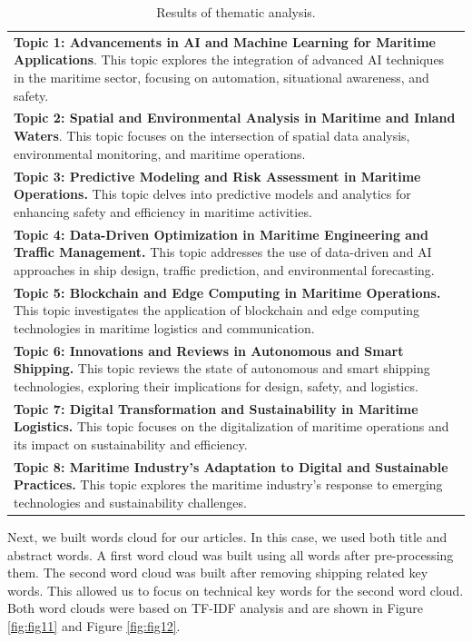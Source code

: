 \documentclass[a4paper, review, endfloat, authoryear]{elsarticle}
\begin{document}
	\begin{table}[h]
		\centering
		\caption{Results of thematic analysis.}
		\begin{tabularx}{\linewidth}{X}
			\hline
			\textbf{Topic 1: Advancements in AI and Machine Learning for Maritime Applications}. This topic explores the integration of advanced AI techniques in the maritime sector, focusing on automation, situational awareness, and safety.\\			
			\textbf{Topic 2: Spatial and Environmental Analysis in Maritime and Inland Waters}. This topic focuses on the intersection of spatial data analysis, environmental monitoring, and maritime operations.\\			
			\textbf{Topic 3: Predictive Modeling and Risk Assessment in Maritime Operations.} This topic delves into predictive models and analytics for enhancing safety and efficiency in maritime activities.\\			
			\textbf{Topic 4: Data-Driven Optimization in Maritime Engineering and Traffic Management.} This topic addresses the use of data-driven and AI approaches in ship design, traffic prediction, and environmental forecasting.\\			
			\textbf{Topic 5: Blockchain and Edge Computing in Maritime Operations.} This topic investigates the application of blockchain and edge computing technologies in maritime logistics and communication.\\			
			\textbf{Topic 6: Innovations and Reviews in Autonomous and Smart Shipping.} This topic reviews the state of autonomous and smart shipping technologies, exploring their implications for design, safety, and logistics.\\			
			\textbf{Topic 7: Digital Transformation and Sustainability in Maritime Logistics.} This topic focuses on the digitalization of maritime operations and its impact on sustainability and efficiency.\\			
			\textbf{Topic 8: Maritime Industry’s Adaptation to Digital and Sustainable Practices.} This topic explores the maritime industry's response to emerging technologies and sustainability challenges.\\
			\hline			
		\end{tabularx}
		\label{tab:thematic}
	\end{table}
	
	Next, we built words cloud for our articles. In this case, we used both title and abstract words. A first word cloud was built using all words after pre-processing them. The second word cloud was built after removing shipping related key words. This allowed us to focus on technical key words for the second word cloud. Both word clouds were based on TF-IDF analysis and are shown in Figure \ref{fig:fig11} and Figure \ref{fig:fig12}.
	
\end{document}
